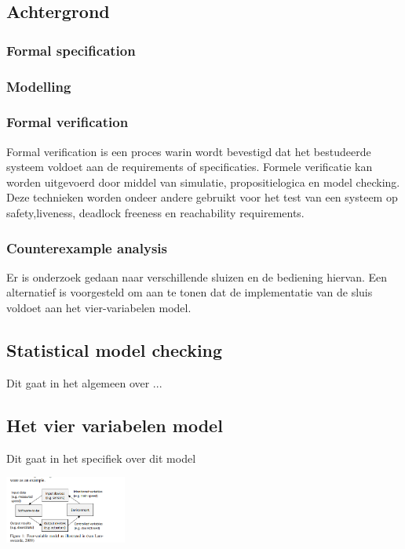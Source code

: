 \documentclass{article}
\begin{document}
	
	
	\subsection{Achtergrond}
	
	\subsubsection{Formal specification}
	
	\subsubsection{Modelling}
	
	\subsubsection{Formal verification}
	Formal verification is een proces warin wordt bevestigd dat het bestudeerde systeem voldoet aan de requirements of specificaties. Formele verificatie kan worden uitgevoerd door middel van simulatie, propositielogica en model checking. Deze technieken worden ondeer andere gebruikt voor het test van een systeem op safety,liveness, deadlock freeness en reachability requirements.
	
	\subsubsection{Counterexample analysis}
	Er is onderzoek gedaan naar verschillende sluizen en de bediening hiervan. 
	Een alternatief is voorgesteld om aan te tonen dat de implementatie van de sluis voldoet aan het vier-variabelen model.
	
	\subsection{Statistical model checking}
	Dit gaat in het algemeen over ...
	
	\subsection{Het vier variabelen model}
	Dit gaat in het specifiek  over  dit model
	
	\includegraphics[width=4cm]{4varmodel.png} %
\end{document}

